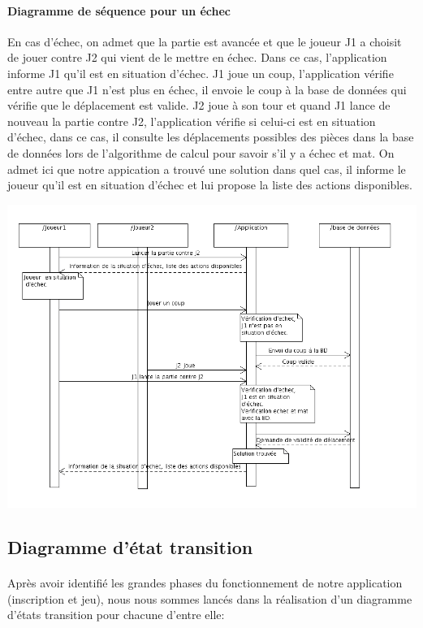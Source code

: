 \documentclass[10pt,a4paper]{report}
\begin{document}
\paragraph{Diagramme de séquence pour un échec}En cas d'échec, on admet que la partie est avancée et que le joueur J1 a choisit de jouer contre J2 qui vient de le mettre en échec. Dans ce cas, l'application informe J1 qu'il est en situation d'échec. J1 joue un coup, l'application vérifie entre autre que J1 n'est plus en échec, il envoie le coup à la base de données qui vérifie que le déplacement est valide. J2 joue à son tour et quand J1 lance de nouveau la partie contre J2, l'application vérifie si celui-ci est en situation d'échec, dans ce cas, il consulte les déplacements possibles des pièces dans la base de données lors de l'algorithme de calcul pour savoir s'il y a échec et mat. On admet ici que notre appication a trouvé une solution dans quel cas, il informe le joueur qu'il est en situation d'échec et lui propose la liste des actions disponibles.
\begin{center}
\includegraphics[width=18cm]{DiagSeqEchec.png}
\end{center}






\subsection{Diagramme d'état transition}
\paragraph{}Après avoir identifié les grandes phases du fonctionnement de notre application (inscription et jeu), nous nous sommes lancés dans la réalisation d'un diagramme d'états transition pour chacune d'entre elle:
\end{document}
